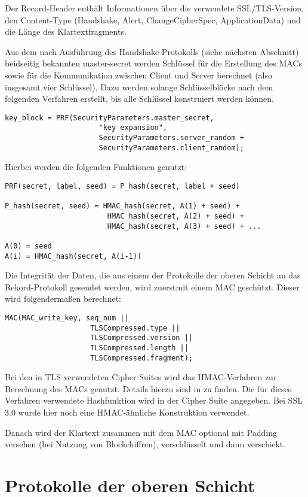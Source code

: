 \documentclass[
    12pt,
    headings=small,
    parskip=half,           %
    bibliography=totoc,
    numbers=noenddot,       %
    open=any,               %
   final                   %
    ]{scrreprt}
\newcommand{\mastersecret}		{master-secret}
\begin{document}
Der Record-Header enthält Informationen über die verwendete SSL/TLS-Version, den Content-Type (Handshake, Alert, ChangeCipherSpec, ApplicationData) und die Länge des Klartextfragments.

Aus dem nach Ausführung des Handshake-Protokolls (siehe nächsten Abschnitt) beidseitig bekannten \mastersecret{} werden Schlüssel für die Erstellung des MACs sowie für die Kommunikation zwischen Client und Server berechnet (also insgesamt vier Schlüssel). Dazu werden solange Schlüsselblöcke nach dem folgenden Verfahren erstellt, bis alle Schlüssel konstruiert werden können. 

\begin{lstlisting}
key_block = PRF(SecurityParameters.master_secret,
                      "key expansion",
                      SecurityParameters.server_random +
                      SecurityParameters.client_random);
\end{lstlisting}

Hierbei werden die folgenden Funktionen genutzt:

\begin{lstlisting}
PRF(secret, label, seed) = P_hash(secret, label + seed)

P_hash(secret, seed) = HMAC_hash(secret, A(1) + seed) +
						HMAC_hash(secret, A(2) + seed) +
						HMAC_hash(secret, A(3) + seed) + ...

A(0) = seed
A(i) = HMAC_hash(secret, A(i-1))
\end{lstlisting}

Die Integrität der Daten, die aus einem der Protokolle der oberen Schicht an das Rekord-Protokoll gesendet werden, wird zuerstmit einem MAC geschützt. Dieser wird folgendermaßen berechnet:
\begin{lstlisting}
MAC(MAC_write_key, seq_num ||
					TLSCompressed.type ||
					TLSCompressed.version ||
					TLSCompressed.length ||
					TLSCompressed.fragment);
\end{lstlisting}
Bei den in TLS verwendeten Cipher Suites wird das HMAC-Verfahren zur Berechnung des MACs genutzt. Details hierzu sind in \cite{hmac97} zu finden. Die für dieses Verfahren verwendete Hashfunktion wird in der Cipher Suite angegeben. Bei SSL 3.0 wurde hier noch eine HMAC-ähnliche Konstruktion verwendet.

Danach wird der Klartext zusammen mit dem MAC optional mit Padding versehen (bei Nutzung von Blockchiffren), verschlüsselt und dann verschickt.


\section{Protokolle der oberen Schicht}
\end{document}

